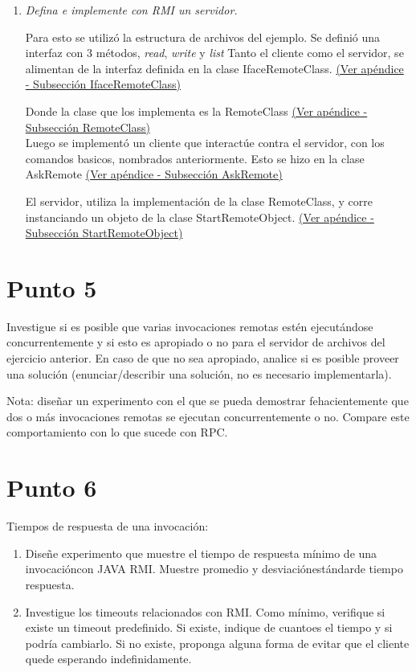 \documentclass[12pt,journal,compsoc]{IEEEtran}
\begin{document}
\begin{enumerate}[label=\alph* -]
  \item \textit{Defina e implemente con RMI un servidor.}
  
  Para esto se utilizó la estructura de archivos del ejemplo. Se definió
  una interfaz con 3 métodos, \textit{read}, \textit{write} y
  \textit{list}
  Tanto el cliente como el servidor, se alimentan de la interfaz definida
  en la clase IfaceRemoteClass.
  \hyperref[section:IfaceRemoteClass]{(Ver apéndice - Subsección IfaceRemoteClass)}
  
  Donde la clase que los implementa es la RemoteClass
  \hyperref[section:RemoteClass]{(Ver apéndice - Subsección RemoteClass)}\\
  
  Luego se implementó un cliente que interactúe contra el servidor, con
  los comandos basicos, nombrados anteriormente. Esto se hizo en la clase
  AskRemote
  \hyperref[section:AskRemote]{(Ver apéndice - Subsección AskRemote)}

  El servidor, utiliza la implementación de la clase RemoteClass, y
  corre instanciando un objeto de la clase StartRemoteObject.
  \hyperref[section:StartRemoteObject]{(Ver apéndice - Subsección StartRemoteObject)}

\end{enumerate}

\section{Punto 5}

Investigue si es posible que varias invocaciones remotas estén
ejecutándose concurrentemente y si esto es apropiado o no para el
servidor de archivos del ejercicio anterior. En caso de que no sea 
apropiado, analice si es posible proveer una solución
(enunciar/describir una solución, no es necesario implementarla).

Nota: diseñar un experimento con el que se pueda demostrar
fehacientemente que dos o más invocaciones remotas se ejecutan
concurrentemente o no. Compare este comportamiento con lo que sucede con
RPC.

\section{Punto 6}

Tiempos de respuesta de una invocación:

\begin{enumerate}[label=\alph* -]
  \item Diseñe experimento que muestre el tiempo de respuesta mínimo de
  una invocacióncon JAVA RMI. Muestre promedio y desviaciónestándarde
  tiempo respuesta.

  \item Investigue los timeouts relacionados con RMI. Como mínimo,
  verifique si existe un timeout predefinido. Si existe, indique de
  cuantoes el tiempo y si podría cambiarlo. Si no existe, proponga alguna
  forma de evitar que el cliente quede esperando indefinidamente.

\end{enumerate}
\end{document}
